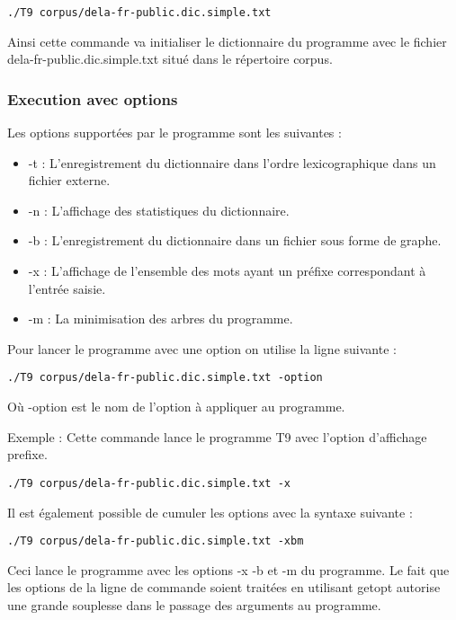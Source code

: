 \documentclass[15pt, a4paper]{article}
\begin{document}
\begin{verbatim}
./T9 corpus/dela-fr-public.dic.simple.txt
\end{verbatim}

Ainsi cette commande va initialiser le dictionnaire du programme avec le fichier 
dela-fr-public.dic.simple.txt situé dans le répertoire corpus. 

\subsubsection{Execution avec options}

\noindent Les options supportées par le programme sont les suivantes :

\begin{itemize}
\item -t : L'enregistrement du dictionnaire dans l'ordre lexicographique dans un fichier externe.
\item -n : L'affichage des statistiques du dictionnaire.
\item -b : L'enregistrement du dictionnaire dans un fichier sous forme de graphe.
\item -x : L'affichage de l'ensemble des mots ayant un préfixe correspondant à l'entrée saisie.
\item -m : La minimisation des arbres du programme.
\end{itemize}

\bigskip

\noindent Pour lancer le programme avec une option on utilise la ligne suivante :

\begin{verbatim}
./T9 corpus/dela-fr-public.dic.simple.txt -option
\end{verbatim}

\noindent Où -option est le nom de l'option à appliquer au programme.

\bigskip

\noindent Exemple : Cette commande lance le programme T9 avec l'option d'affichage prefixe.

\begin{verbatim}
./T9 corpus/dela-fr-public.dic.simple.txt -x
\end{verbatim}

\bigskip

Il est également possible de cumuler les options avec la syntaxe suivante :
\begin{verbatim}
./T9 corpus/dela-fr-public.dic.simple.txt -xbm
\end{verbatim}
Ceci lance le programme avec les options -x -b et -m du programme. Le fait que les options de 
la ligne de commande soient traitées en utilisant getopt autorise une grande souplesse dans
le passage des arguments au programme.
\end{document}
